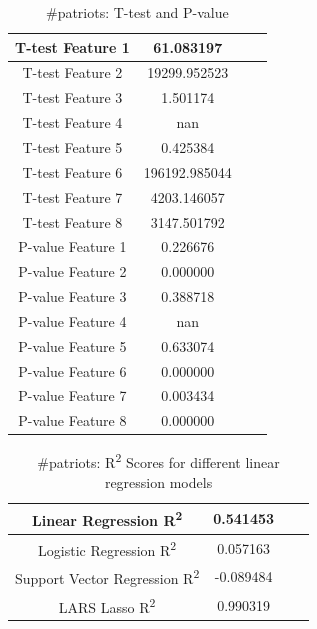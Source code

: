\documentclass[12pt]{article}
\begin{document}
\begin{table}[H]
	\centering
	\begin{tabular}{| c | c | c | c |}
		\hline 
		T-test Feature 1 & 61.083197 \\\hline
		T-test Feature 2 & 19299.952523 \\\hline
		T-test Feature 3 & 1.501174 \\\hline 
		T-test Feature 4 & nan \\\hline
		T-test Feature 5 & 0.425384 \\\hline
		T-test Feature 6 & 196192.985044 \\\hline
		T-test Feature 7 & 4203.146057 \\\hline
		T-test Feature 8 & 3147.501792 \\\hline
		P-value Feature 1 & 0.226676 \\\hline
		P-value Feature 2 & 0.000000 \\\hline
		P-value Feature 3 & 0.388718 \\\hline
		P-value Feature 4 & nan \\\hline
		P-value Feature 5 & 0.633074 \\\hline
		P-value Feature 6 & 0.000000 \\\hline
		P-value Feature 7 & 0.003434 \\\hline
		P-value Feature 8 & 0.000000 \\\hline
	\end{tabular} 
	\caption{\#patriots: T-test and P-value}
	\label{part1:tab1}
\end{table} 


\begin{table}[H]
	\centering
	\begin{tabular}{| c | c | c | c |}
		\hline 
		Linear Regression R\textsuperscript2  & 0.541453 \\\hline
		Logistic Regression R\textsuperscript2  & 0.057163 \\\hline
		Support Vector Regression R\textsuperscript2  & -0.089484 \\\hline
		LARS Lasso R\textsuperscript2  & 0.990319 \\\hline
	\end{tabular} 
	\caption{\#patriots: R\textsuperscript2 Scores for different linear regression models}
	\label{part1:tab1}
\end{table} 
\end{document}
